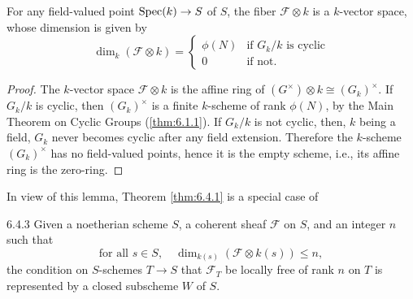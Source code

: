 \begin{klem}\label{lem:6.4.2}
For any field-valued point $\operatorname{Spec}(k) \to S$ of $S$, the fiber $\mathcal{F}\otimes k$ is a $k$-vector space, whose dimension is given by
\[
\dim_k(\mathcal{F}\otimes k) = \begin{cases} \phi(N) & \text{if } G_k/k \text{ is cyclic} \\ 0 & \text{if not.} \end{cases}
\]
\end{klem}

\begin{proof}
The $k$-vector space $\mathcal{F}\otimes k$ is the affine ring of $(G^\times)\otimes k \cong (G_k)^\times$. If $G_k/k$ is cyclic, then $(G_k)^\times$ is a finite $k$-scheme of rank $\phi(N)$, by the Main Theorem on Cyclic Groups (\ref{thm:6.1.1}). If $G_k/k$ is not cyclic, then, $k$ being a field, $G_k$ never becomes cyclic after any field extension. Therefore the $k$-scheme $(G_k)^\times$ has no field-valued points, hence it is the empty scheme, i.e., its affine ring is the zero-ring.
\end{proof}

In view of this lemma, Theorem \ref{thm:6.4.1} is a special case of

\begin{pprop}{6.4.3}\label{prop:6.4.3}
Given a noetherian scheme $S$, a coherent sheaf $\mathcal{F}$ on $S$, and an integer $n$ such that
\[
\text{for all } s \in S, \quad \dim_{k(s)}(\mathcal{F}\otimes k(s)) \le n,
\]
the condition on $S$-schemes $T \to S$ that $\mathcal{F}_T$ be locally free of rank $n$ on $T$ is represented by a closed subscheme $W$ of $S$.
\end{pprop}


